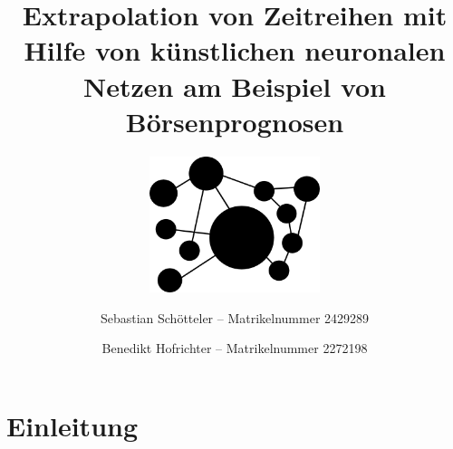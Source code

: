 \documentclass[a4paper,DIV11,bibliography=totoc,headings=normal,ngerman,headsepline]{scrreprt}
\begin{document}
\subject{Seminararbeit}
\title{Extrapolation von Zeitreihen mit Hilfe von künstlichen neuronalen Netzen am Beispiel von Börsenprognosen}
\author{Sebastian Schötteler -- Matrikelnummer 2429289 \and Benedikt Hofrichter -- Matrikelnummer 2272198}
\subtitle{\bigskip\includegraphics[width=50mm]{titelbild.png}} 
\publishers{Technische Hochschule Nürnberg Georg Simon Ohm}

\maketitle

\tableofcontents
\listoffigures
\listoftables
\listofformels

\chapter{Einleitung} %
\label{cha:Einleitung}
\end{document}
